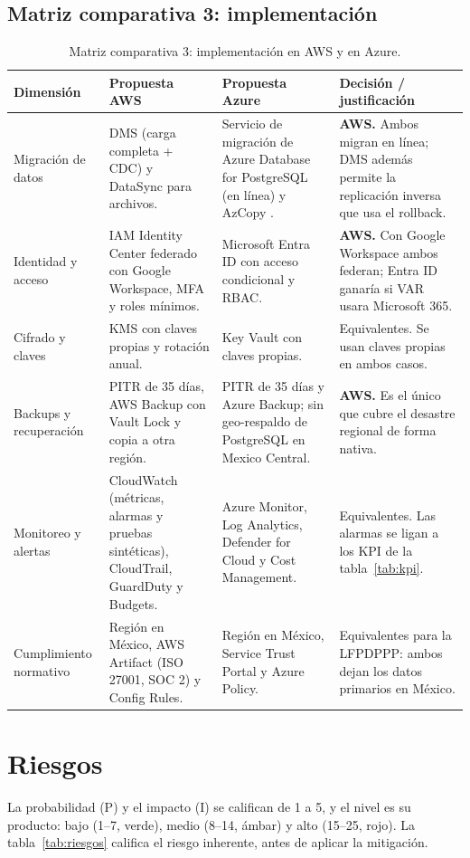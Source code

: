 \documentclass[11pt,letterpaper]{article}
\renewcommand{\arraystretch}{1.18}
\begin{document}
\subsection{Matriz comparativa 3: implementación}
\begin{table}[H]
\centering\footnotesize
\caption{Matriz comparativa 3: implementación en AWS y en Azure.}\label{tab:matriz3}
\renewcommand{\arraystretch}{1.05}
\begin{tabularx}{\linewidth}{L{2.2cm}YYY}
\toprule
\textbf{Dimensión} & \textbf{Propuesta AWS} & \textbf{Propuesta Azure} & \textbf{Decisión / justificación}\\
\midrule
Migración de datos & DMS (carga completa + CDC) y DataSync para archivos. & Servicio de migración de Azure Database for PostgreSQL (en línea) y AzCopy \parencite{az-pg-migration}. & \textbf{AWS.} Ambos migran en línea; DMS además permite la replicación inversa que usa el rollback.\\
 Identidad y acceso & IAM Identity Center federado con Google Workspace, MFA y roles mínimos. & Microsoft Entra ID con acceso condicional y RBAC. & \textbf{AWS.} Con Google Workspace ambos federan; Entra ID ganaría si VAR usara Microsoft 365.\\
Cifrado y claves & KMS con claves propias y rotación anual. & Key Vault con claves propias. & Equivalentes. Se usan claves propias en ambos casos.\\
 Backups y recuperación & PITR de 35 días, AWS Backup con Vault Lock y copia a otra región. & PITR de 35 días y Azure Backup; sin geo-respaldo de PostgreSQL en Mexico Central. & \textbf{AWS.} Es el único que cubre el desastre regional de forma nativa.\\
Monitoreo y alertas & CloudWatch (métricas, alarmas y pruebas sintéticas), CloudTrail, GuardDuty y Budgets. & Azure Monitor, Log Analytics, Defender for Cloud y Cost Management. & Equivalentes. Las alarmas se ligan a los KPI de la tabla~\ref{tab:kpi}.\\
 Cumplimiento normativo & Región en México, AWS Artifact (ISO 27001, SOC 2) y Config Rules. & Región en México, Service Trust Portal y Azure Policy. & Equivalentes para la LFPDPPP: ambos dejan los datos primarios en México.\\
\bottomrule
\end{tabularx}
\end{table}

\section{Riesgos}\label{sec:riesgos}
La probabilidad (P) y el impacto (I) se califican de 1 a 5, y el nivel es su producto: bajo (1–7, verde), medio (8–14, ámbar) y alto (15–25, rojo). La tabla~\ref{tab:riesgos} califica el riesgo inherente, antes de aplicar la mitigación.
\end{document}
